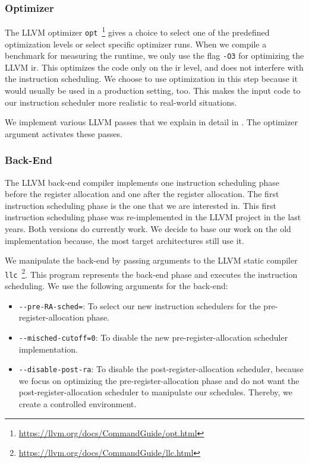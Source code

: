 \subsubsection{Optimizer}
The LLVM optimizer \lstinline{opt}~\footnote{\url{https://llvm.org/docs/CommandGuide/opt.html}} gives a choice to select one of the predefined optimization levels or select specific optimizer runs.
When we compile a benchmark for measuring the runtime, we only use the flag \lstinline{-O3} for optimizing the LLVM \ac{ir}.
This optimizes the code only on the \ac{ir} level, and does not interfere with the instruction scheduling.
We choose to use optimization in this step because it would usually be used in a production setting, too.
This makes the input code to our instruction scheduler more realistic to real-world situations.

We implement various LLVM passes that we explain in detail in .
The optimizer argument \mbox{} activates these passes.

\subsubsection{Back-End}
The LLVM back-end compiler implements one instruction scheduling phase before the register allocation and one after the register allocation.
The first instruction scheduling phase is the one that we are interested in.
This first instruction scheduling phase was re-implemented in the LLVM project in the last years.
Both versions do currently work.
We decide to base our work on the old implementation because, the most target architectures still use it.

We manipulate the back-end by passing arguments to the LLVM static compiler \lstinline{llc}~\footnote{\url{https://llvm.org/docs/CommandGuide/llc.html}}.
This program represents the back-end phase and executes the instruction scheduling.
We use the following arguments for the back-end:
\begin{itemize}
    \item \lstinline{--pre-RA-sched=}: To select our new instruction schedulers for the pre-register-allocation phase.
    \item \lstinline{--misched-cutoff=0}: To disable the new pre-register-allocation scheduler implementation.
    \item \lstinline{--disable-post-ra}: To disable the post-register-allocation scheduler, because we focus on optimizing the pre-register-allocation phase and do not want the post-register-allocation scheduler to manipulate our schedules. Thereby, we create a controlled environment.
\end{itemize}

